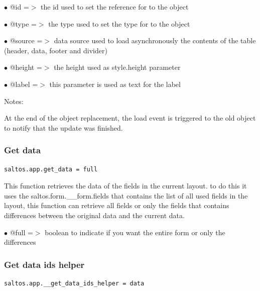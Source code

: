 \documentclass[a4paper]{article}
\begin{document}
\begin{compactitem}
\item[\color{myblue}$\bullet$] @id     =$>$ the id used to set the reference for to the object
\item[\color{myblue}$\bullet$] @type   =$>$ the type used to set the type for to the object
\item[\color{myblue}$\bullet$] @source =$>$ data source used to load asynchronously the contents of the table (header, data,
           footer and divider)
\item[\color{myblue}$\bullet$] @height =$>$ the height used as style.height parameter
\item[\color{myblue}$\bullet$] @label  =$>$ this parameter is used as text for the label
\end{compactitem}

Notes:

At the end of the object replacement, the load event is triggered to the old object to notify
that the update was finished.

\hypertarget{toc13}{}
\subsubsection{Get data}

\begin{lstlisting}
saltos.app.get_data = full
\end{lstlisting}

This function retrieves the data of the fields in the current layout. to do this it uses
the saltos.form.\_\_form.fields that contains the list of all used fields in the layout, this
function can retrieve all fields or only the fields that contains differences between the
original data and the current data.

\begin{compactitem}
\item[\color{myblue}$\bullet$] @full =$>$ boolean to indicate if you want the entire form or only the differences
\end{compactitem}

\hypertarget{toc14}{}
\subsubsection{Get data ids helper}

\begin{lstlisting}
saltos.app.__get_data_ids_helper = data
\end{lstlisting}
\end{document}

